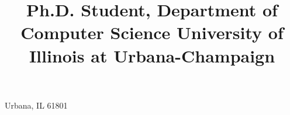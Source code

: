 
\usepackage[margin=0.75in]{geometry}

\makeatletter %
\makeatother  %



\setlength{\hintscolumnwidth}{2.2cm}


\title{
    Ph.D. Student, Department of Computer Science \texorpdfstring{\newline}{}
    University of Illinois at Urbana-Champaign
}

\address{723 Brosky Drive}{Urbana, IL 61801}


\usepackage{multibib} %


\makeatletter %
\renewcommand*\bibliographyitemlabel{\@biblabel{\arabic{enumiv}}}
\makeatother  %


